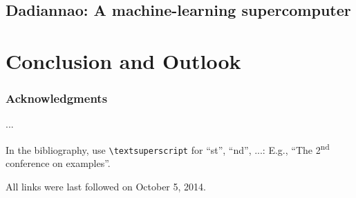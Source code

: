 \documentclass[runningheads,a4paper]{llncs}
\begin{document}
\subsection*{Dadiannao: A machine-learning supercomputer \cite{chen2014dadiannao}}
\newpage
\section{Conclusion and Outlook}

\subsubsection*{Acknowledgments}
...

In the bibliography, use \texttt{\textbackslash textsuperscript} for ``st'', ``nd'', ...:
E.g., \enquote{The 2\textsuperscript{nd} conference on examples}.




All links were last followed on October 5, 2014.
\nocite{*}
\end{document}
